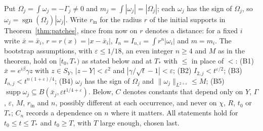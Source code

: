 \documentclass[11pt]{article}
\theoremstyle{definition}
\begin{document}
Put $\Omega_j = \int\omega_j = -\Gamma_j \ne 0$ and $m_j = \int|\omega_j| = |\Omega_j|$; each $\omega_j$ has the sign of $\Omega_j$, so $\omega_j = \operatorname{sgn}(\Omega_j)|\omega_j|$. Write $r_{\mathrm{in}}$ for the radius $r$ of the initial supports in Theorem~\ref{thm:patches}, since from now on $r$ denotes a distance: for a fixed $i$ write $\bar x = \bar x_i$, $r = r(x) = |x - \bar x_i|$, $I_n = I_{n,i} = \int r^n|\omega_i|$ and $m = m_i$. The bootstrap assumptions, with $\varepsilon \le 1/18$, an even integer $n \ge 4$ and $M$ as in the theorem, hold on $[t_0, T_*)$ as stated below and at $T_*$ with $\le$ in place of $<$:
(B1) $\bar x = e^{i\beta}\gamma z$ with $z \in S_Y$, $|z - Y| < \varepsilon^2$ and $|\gamma/\sqrt t - 1| < \varepsilon$;
(B2) $I_{2,j} < t^{\varepsilon/2}$;
(B3) $I_{n,j} < t^{n(1+\varepsilon)/4}$;
(B4) $\omega_j$ has the sign of $\Omega_j$ and $\|\omega_j\|_{L^{2+\varepsilon}} \le M$;
(B5) $\operatorname{supp}\omega_j \subseteq B(\bar x_j, \varepsilon t^{1/4+\varepsilon})$.
Below, $C$ denotes constants that depend only on $Y$, $\Gamma$, $\varepsilon$, $M$, $r_{\mathrm{in}}$ and $n$, possibly different at each occurrence, and never on $\chi$, $R$, $t_0$ or $T_*$; $C_n$ records a dependence on $n$ where it matters. All statements hold for $t_0 \le t \le T_*$ and $t_0 \ge T$, with $T$ large enough, chosen last.
\end{document}
